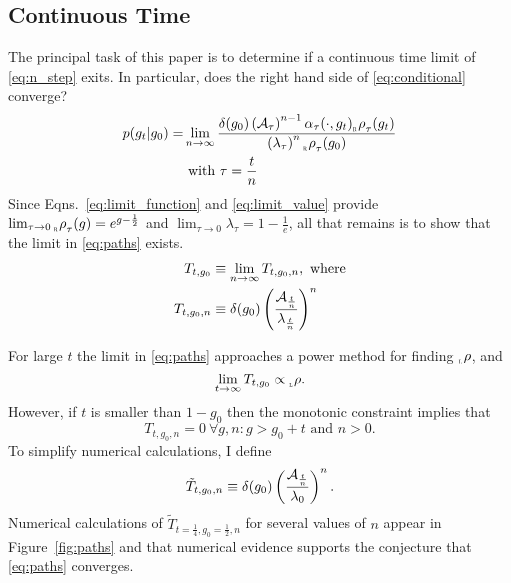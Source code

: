 \documentclass[12pt]{article} \usepackage{amsmath,amsfonts}
\newcommand{\Aop}{{\cal A}}
\newcommand{\Aindicate}{\alpha}
\newcommand{\density}{p}
\newcommand{\rightfunction}{{_{_{\scalebox{.4}{R}}} \rho}}
\newcommand{\leftfunction}{{_{_{\scalebox{.4}{L}}} \rho}}
\begin{document}
\subsection{Continuous Time}
\label{sec:continuous_t}

The principal task of this paper is to determine if a continuous time
limit of \eqref{eq:n_step} exits.  In particular, does the right hand
side of \eqref{eq:conditional} converge?
\begin{align}
  \label{eq:conditional}
  \density(g_t|g_0) = &\lim_{n \rightarrow \infty}  \frac{\delta(g_0)
    \left( \Aop_\tau \right)^{n-1} \Aindicate_\tau(\cdot,g_t)
    \rightfunction_\tau(g_t)} { \left( \lambda_\tau \right)^n
    \rightfunction_\tau(g_0)} \\
  & \text{ with } \tau=\frac{t}{n} \nonumber
\end{align}
Since Eqns.~\eqref{eq:limit_function} and \eqref{eq:limit_value}
provide
$\lim_{\tau \rightarrow 0} \rightfunction_\tau(g) = e^{g-\frac{1}{2}}$
and $\lim_{\tau \rightarrow 0} \lambda_\tau = 1 - \frac{1}{e}$, all
that remains is to show that the limit in \eqref{eq:paths} exists.
\begin{align}
  \label{eq:paths}
  T_{t,g_0} & \equiv \lim_{n \rightarrow \infty} T_{t,g_0,n}, \text{
  where}\\
  T_{t,g_0,n} & \equiv \delta(g_0) \left( \frac{\Aop_{\frac{t}{n}}}
                {\lambda_{\frac{t}{n}}} \right)^n  \nonumber
\end{align}

For large $t$ the limit in \eqref{eq:paths} approaches a power method for
finding $\leftfunction$, and
\begin{equation*}
  \lim_{t \rightarrow \infty} T_{t,g_0} \propto \leftfunction.
\end{equation*}
However, if $t$ is smaller than $1 - g_0$ then the monotonic
constraint implies that
\begin{equation*}
  T_{t,g_0,n} = 0 ~\forall g,n: g > g_0 + t \text{ and } n > 0.
\end{equation*}
To simplify numerical calculations, I define
\begin{equation*}
  \tilde T_{t,g_0,n} \equiv \delta(g_0) \left( \frac{\Aop_{\frac{t}{n}}}
                {\lambda_0} \right)^n.
\end{equation*}
Numerical calculations of $\tilde T_{t=\frac{1}{4},g_0=\frac{1}{2},n}$
for several values of $n$ appear in Figure~\ref{fig:paths} and that
numerical evidence supports the conjecture that \eqref{eq:paths}
converges.
\begin{figure*}
  \centering
  \caption{These plots of $\tilde T_{t=\frac{1}{4},g_0=\frac{1}{2},n}$
    for several values of $n$, suggest that $\lim_{n \rightarrow
      \infty}$ exists.}
  \label{fig:paths}
\end{figure*}
\end{document}

